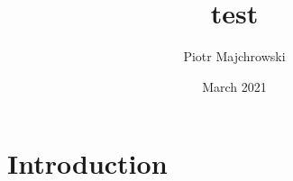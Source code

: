 \documentclass{article}
\title{test}
\author{Piotr Majchrowski}
\date{March 2021}
\begin{document}
\maketitle

\section{Introduction}
\end{document}

